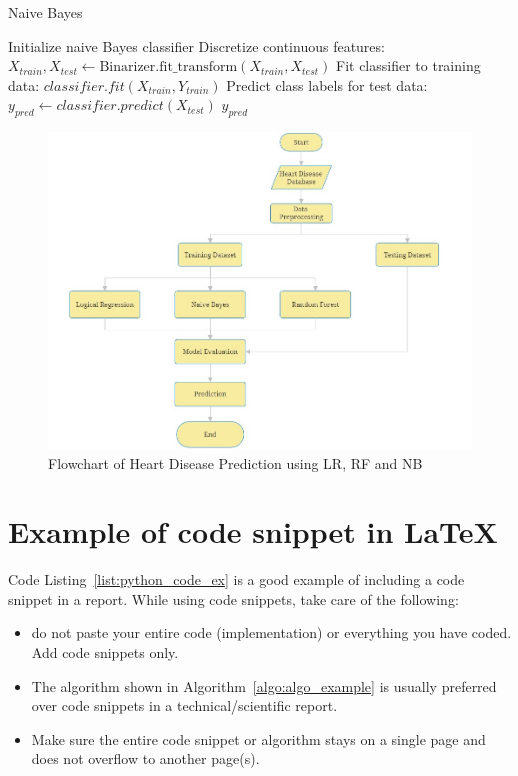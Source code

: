 \begin{algorithm}
    \caption{Naive Bayes}
    \label{algo:naive_bayes}
    \begin{algorithmic}[1]
        \Statex
        \State Initialize naive Bayes classifier
        \State Discretize continuous features: $X_{train}, X_{test} \gets \text{Binarizer.fit\_transform}(X_{train}, X_{test})$
        \State Fit classifier to training data: $classifier.fit(X_{train}, Y_{train})$
        \State Predict class labels for test data: $y_{pred} \gets classifier.predict(X_{test})$
        \State \Return $y_{pred}$
        \EndFunction
    \end{algorithmic}
\end{algorithm}


\begin{figure}
    \centering
    \includegraphics[width=1\linewidth]{figures/Flowchart.jpg}
    \caption{Flowchart of Heart Disease Prediction using LR, RF and NB}
    \label{fig:enter-label}
\end{figure}

\section{Example of code snippet  in \LaTeX}

Code Listing~\ref{list:python_code_ex} is a good example of including a code snippet in a report. While using code snippets, take care of the following:
\begin{itemize}
    \item do not paste your entire code (implementation) or everything you have coded. Add code snippets only. 
    \item The algorithm shown in Algorithm~\ref{algo:algo_example} is usually preferred over code snippets in a technical/scientific report. 
    \item Make sure the entire code snippet or algorithm stays on a single page and does not overflow to another page(s).  
\end{itemize}

